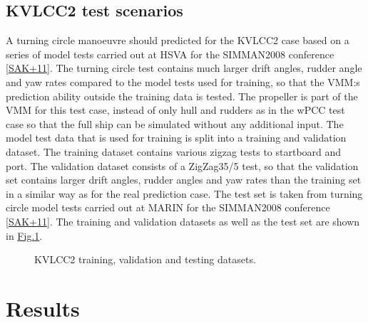 \documentclass[review]{elsarticle}
\begin{document}
\subsection{KVLCC2 test scenarios}
\label{\detokenize{05.01_case_studies:kvlcc2-test-scenarios}}
\sphinxAtStartPar
A turning circle manoeuvre should predicted for the KVLCC2 case based on a series of model tests carried out at HSVA for the SIMMAN2008 conference {[}\hyperlink{cite.bibligraphy:id79}{SAK+11}{]}. The turning circle test contains much larger drift angles, rudder angle and yaw rates compared to the model tests used for training, so that
the VMM:s prediction ability outside the training data is tested.
The propeller is part of the VMM for this test case, instead of only hull and rudders as in the wPCC test case so that the full ship can be simulated without any additional input.
The model test data that is used for training is split into a training and validation dataset. The training dataset contains various zigzag tests to startboard and port. The validation dataset consists of a ZigZag35/5 test, so that the validation set contains larger drift angles, rudder angles and yaw rates than the training set in a similar way as for the real prediction case. The test set is taken from turning circle model tests carried out at MARIN for the SIMMAN2008 conference {[}\hyperlink{cite.bibligraphy:id79}{SAK+11}{]}. The training and validation datasets as well as the test set are shown in \hyperref[\detokenize{05.01_case_studies:fig-kvlcc2-traintest}]{Fig.\@ \ref{\detokenize{05.01_case_studies:fig-kvlcc2-traintest}}}.

\begin{figure}[H]
\centering
\capstart

\noindent{}
\caption{KVLCC2 training, validation and testing datasets.}\label{\detokenize{05.01_case_studies:fig-kvlcc2-traintest}}\end{figure}


\section{Results}
\label{\detokenize{06.01_results:results}}\label{\detokenize{06.01_results:id1}}\label{\detokenize{06.01_results::doc}}
\end{document}

